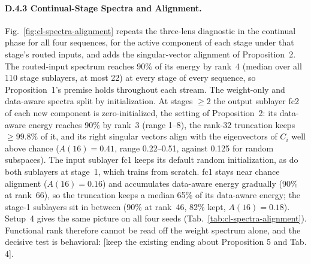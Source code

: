 \paragraph{D.4.3 Continual-Stage Spectra and Alignment.}
Fig.~\ref{fig:cl-spectra-alignment} repeats the three-lens diagnostic in the continual phase for
all four sequences, for the active component of each stage under that stage's routed inputs, and
adds the singular-vector alignment of Proposition~2. The routed-input spectrum reaches 90\% of
its energy by rank~4 (median over all 110 stage sublayers, at most 22) at every stage of every
sequence, so Proposition~1's premise holds throughout each stream. The weight-only and data-aware
spectra split by initialization. At stages $\geq 2$ the output sublayer fc2 of each new component
is zero-initialized, the setting of Proposition~2: its data-aware energy reaches 90\% by rank~3
(range 1--8), the rank-32 truncation keeps $\geq 99.8\%$ of it, and its right singular vectors
align with the eigenvectors of $C_i$ well above chance ($A(16)=0.41$, range 0.22--0.51, against
0.125 for random subspaces). The input sublayer fc1 keeps its default random initialization, as
do both sublayers at stage~1, which trains from scratch. fc1 stays near chance alignment
($A(16)=0.16$) and accumulates data-aware energy gradually (90\% at rank~66), so the truncation
keeps a median 65\% of its data-aware energy; the stage-1 sublayers sit in between (90\% at
rank~46, 82\% kept, $A(16)=0.18$). Setup~4 gives the same picture on all four seeds
(Tab.~\ref{tab:cl-spectra-alignment}).
Functional rank therefore cannot be read off the weight spectrum alone, and the decisive test is
behavioral: [keep the existing ending about Proposition 5 and Tab. 4].

